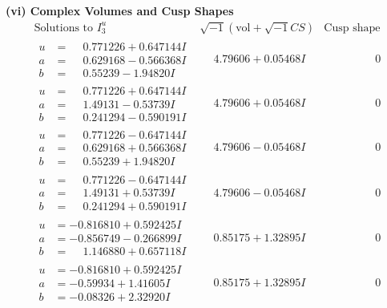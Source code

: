 \documentclass[1p]{elsarticle_modified}
\theoremstyle{definition}
\newcommand{\I}{\sqrt{-1}}
\begin{document}
\newpage\flushleft \textbf{(vi) Complex Volumes and Cusp Shapes}
$$\begin{array}{c|c|c}  
\text{Solutions to }I^u_{3}& \I (\text{vol} + \sqrt{-1}CS) & \text{Cusp shape}\\
 \hline 
\begin{aligned}
u &= \phantom{-}0.771226 + 0.647144 I \\
a &= \phantom{-}0.629168 - 0.566368 I \\
b &= \phantom{-}0.55239 - 1.94820 I\end{aligned}
 & \phantom{-}4.79606 + 0.05468 I & \phantom{-0.000000 } 0 \\ \hline\begin{aligned}
u &= \phantom{-}0.771226 + 0.647144 I \\
a &= \phantom{-}1.49131 - 0.53739 I \\
b &= \phantom{-}0.241294 - 0.590191 I\end{aligned}
 & \phantom{-}4.79606 + 0.05468 I & \phantom{-0.000000 } 0 \\ \hline\begin{aligned}
u &= \phantom{-}0.771226 - 0.647144 I \\
a &= \phantom{-}0.629168 + 0.566368 I \\
b &= \phantom{-}0.55239 + 1.94820 I\end{aligned}
 & \phantom{-}4.79606 - 0.05468 I & \phantom{-0.000000 } 0 \\ \hline\begin{aligned}
u &= \phantom{-}0.771226 - 0.647144 I \\
a &= \phantom{-}1.49131 + 0.53739 I \\
b &= \phantom{-}0.241294 + 0.590191 I\end{aligned}
 & \phantom{-}4.79606 - 0.05468 I & \phantom{-0.000000 } 0 \\ \hline\begin{aligned}
u &= -0.816810 + 0.592425 I \\
a &= -0.856749 - 0.266899 I \\
b &= \phantom{-}1.146880 + 0.657118 I\end{aligned}
 & \phantom{-}0.85175 + 1.32895 I & \phantom{-0.000000 } 0 \\ \hline\begin{aligned}
u &= -0.816810 + 0.592425 I \\
a &= -0.59934 + 1.41605 I \\
b &= -0.08326 + 2.32920 I\end{aligned}
 & \phantom{-}0.85175 + 1.32895 I & \phantom{-0.000000 } 0 \\ \hline\begin{aligned}

\end{aligned}
\end{array}$$
\end{document}
